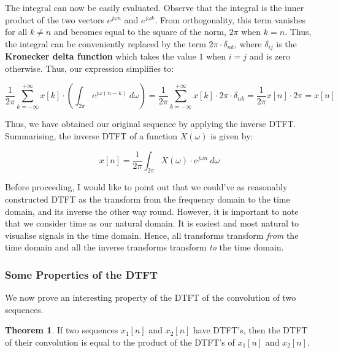 \documentclass{article}
\theoremstyle{definition}
\newtheorem{theorem}{Theorem}[subsection]
\begin{document}
The integral can now be easily evaluated. Observe that the integral is the inner product of the two vectors $e^{j\omega n}$ and $e^{j\omega k}$. From orthogonality, this term vanishes for all $k \neq n$ and becomes equal to the square of the norm, $2\pi$ when $k=n$. Thus, the integral can be conveniently replaced by the term $2\pi \cdot \delta_{nk}$, where $\delta_{ij}$ is the \textbf{Kronecker delta function} which takes the value $1$ when $i=j$ and is zero otherwise. Thus, our expression simplifies to:

\[
	\frac{1}{2\pi} \sum_{k = -\infty}^{+\infty} x[k] \cdot \left(\int_{2\pi} e^{j\omega(n-k)} \: d\omega \right) = \frac{1}{2\pi} \sum_{k = -\infty}^{+\infty} x[k] \cdot 2\pi \cdot \delta_{nk} = \frac{1}{2\pi} x[n] \cdot 2\pi = x[n]
\]

Thus, we have obtained our original sequence by applying the inverse DTFT. Summarising, the inverse DTFT of a function $X(\omega)$ is given by:

\[
	\boxed{x[n] = \frac{1}{2\pi} \int_{2\pi} X(\omega) \cdot e^{j\omega n} \: d\omega}
\] 

Before proceeding, I would like to point out that we could've as reasonably constructed DTFT as the transform from the frequency domain to the time domain, and its inverse the other way round. However, it is important to note that we consider time as our natural domain. It is easiest and most natural to visualise signals in the time domain. Hence, all transforms transform \textit{from} the time domain and all the inverse transforms transform \textit{to} the time domain.

\subsubsection{Some Properties of the DTFT}

We now prove an interesting property of the DTFT of the convolution of two sequences. 
\begin{theorem}
If two sequences $x_1[n]$ and $x_2[n]$ have DTFT's, then the DTFT of their convolution is equal to the product of the DTFT's of $x_1[n]$ and $x_2[n]$.
\end{theorem}
\end{document}
